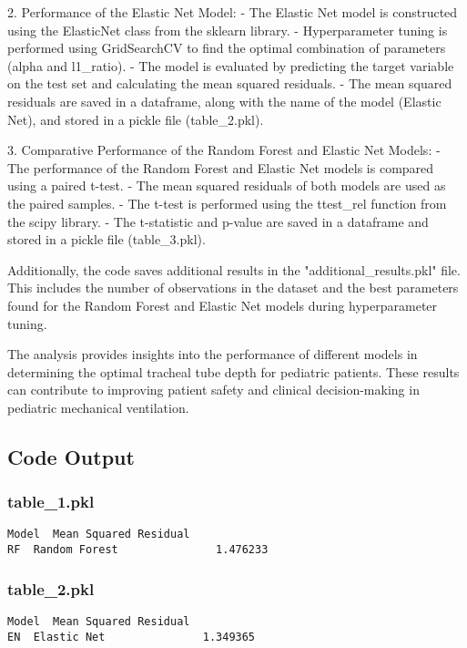 \documentclass[11pt]{article}
\begin{document}
2. Performance of the Elastic Net Model:
   - The Elastic Net model is constructed using the ElasticNet class from the sklearn library.
   - Hyperparameter tuning is performed using GridSearchCV to find the optimal combination of parameters (alpha and l1\_ratio).
   - The model is evaluated by predicting the target variable on the test set and calculating the mean squared residuals.
   - The mean squared residuals are saved in a dataframe, along with the name of the model (Elastic Net), and stored in a pickle file (table\_2.pkl).

3. Comparative Performance of the Random Forest and Elastic Net Models:
   - The performance of the Random Forest and Elastic Net models is compared using a paired t-test.
   - The mean squared residuals of both models are used as the paired samples.
   - The t-test is performed using the ttest\_rel function from the scipy library.
   - The t-statistic and p-value are saved in a dataframe and stored in a pickle file (table\_3.pkl).

Additionally, the code saves additional results in the "additional\_results.pkl" file. This includes the number of observations in the dataset and the best parameters found for the Random Forest and Elastic Net models during hyperparameter tuning.

The analysis provides insights into the performance of different models in determining the optimal tracheal tube depth for pediatric patients. These results can contribute to improving patient safety and clinical decision-making in pediatric mechanical ventilation.

\subsection{Code Output}

\subsubsection*{table\_1.pkl}

\begin{Verbatim}[tabsize=4]
            Model  Mean Squared Residual
RF  Random Forest               1.476233
\end{Verbatim}

\subsubsection*{table\_2.pkl}

\begin{Verbatim}[tabsize=4]
          Model  Mean Squared Residual
EN  Elastic Net               1.349365
\end{Verbatim}
\end{document}
